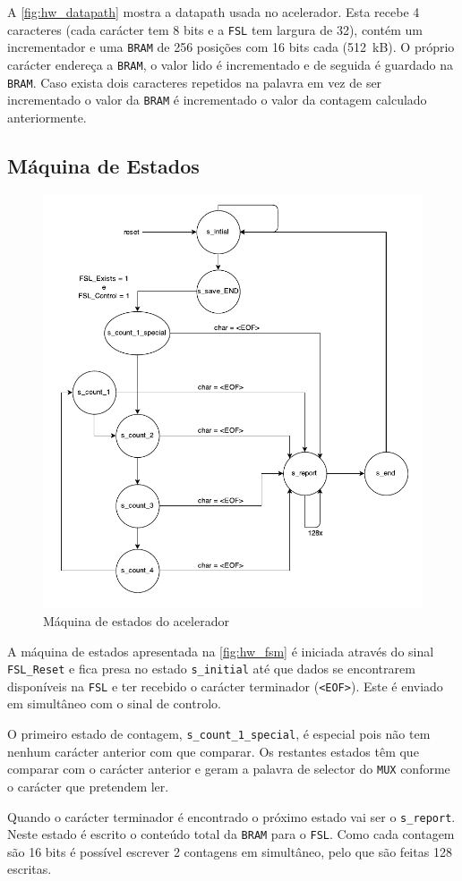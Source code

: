   A \autoref{fig:hw_datapath} mostra a datapath usada no acelerador. Esta recebe 4 caracteres (cada carácter tem 8 bits e a \texttt{FSL} tem largura de 32), contém um incrementador e uma \texttt{BRAM} de 256 posições com 16 bits cada (512~kB). O próprio carácter endereça a \texttt{BRAM}, o valor lido é incrementado e de seguida é guardado na \texttt{BRAM}. Caso exista dois caracteres repetidos na palavra em vez de ser incrementado o valor da \texttt{BRAM} é incrementado o valor da contagem calculado anteriormente.

\subsection{Máquina de Estados}
  \begin{figure}[H]
    \centering
    \includegraphics[width=1.\textwidth]{img/fsm}
    \caption{Máquina de estados do acelerador}
    \label{fig:hw_fsm}
  \end{figure}

  A máquina de estados apresentada na \autoref{fig:hw_fsm} é iniciada através do sinal \texttt{FSL\_Reset} e fica presa no estado \texttt{s\_initial} até que dados se encontrarem disponíveis na \texttt{FSL} e ter recebido o carácter terminador (\texttt{<EOF>}). Este é enviado em simultâneo com o sinal de controlo.

  O primeiro estado de contagem, \texttt{s\_count\_1\_special}, é especial pois não tem nenhum carácter anterior com que comparar. Os restantes estados têm que comparar com o carácter anterior e geram a palavra de selector do \texttt{MUX} conforme o carácter que pretendem ler.

  Quando o carácter terminador é encontrado o próximo estado vai ser o \texttt{s\_report}. Neste estado é escrito o conteúdo total da \texttt{BRAM} para o \texttt{FSL}. Como cada contagem são 16 bits é possível escrever 2 contagens em simultâneo, pelo que são feitas 128 escritas.
